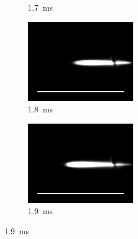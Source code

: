 \begin{figure}[h]
\begin{subfigure}[t]{0.3\textwidth}
            \caption{\qty{1.7}{ms}}
            \label{fig:ignition_frames_17}
        \end{subfigure}
        \hfill
        \begin{subfigure}[t]{0.3\textwidth}
            \centering
            \includegraphics[width=\textwidth]{assets/5 results/ignitionFrames/18.jpg}
            \caption{\qty{1.8}{ms}}
            \label{fig:ignition_frames_18}
        \end{subfigure}
        \begin{subfigure}[t]{0.3\textwidth}
            \centering
            \includegraphics[width=\textwidth]{assets/5 results/ignitionFrames/19.jpg}
            \caption{\qty{1.9}{ms}}
            \label{fig:ignition_frames_19}

\end{subfigure}
\end{figure}

